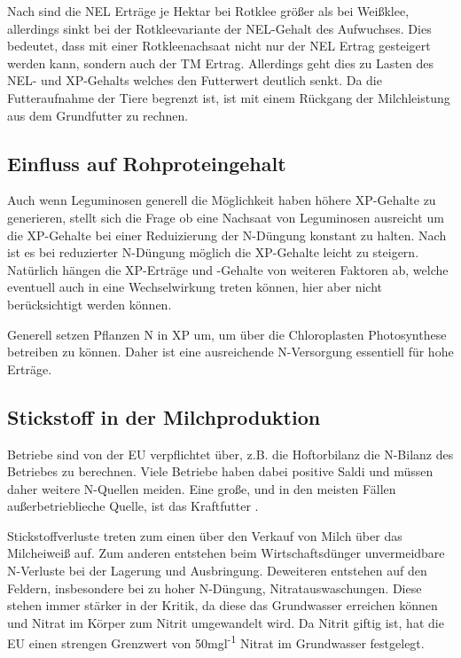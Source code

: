 Nach \textcite[35-36]{weggler2050leguminosen} sind die \ac{NEL} Erträge je Hektar bei Rotklee größer als bei Weißklee, allerdings sinkt bei der Rotkleevariante der \ac{NEL}-Gehalt des Aufwuchses.
Dies bedeutet, dass mit einer Rotkleenachsaat nicht nur der \ac{NEL} Ertrag gesteigert werden kann, sondern auch der \ac{TM} Ertrag.
Allerdings geht dies zu Lasten des \ac{NEL}- und \ac{XP}-Gehalts welches den Futterwert deutlich senkt.
Da die Futteraufnahme der Tiere begrenzt ist, ist mit einem Rückgang der Milchleistung aus dem Grundfutter zu rechnen.

\subsection{Einfluss auf Rohproteingehalt}
\label{subsec:Protein}

Auch wenn Leguminosen generell die Möglichkeit haben höhere \ac{XP}-Gehalte zu generieren, stellt sich die Frage ob eine Nachsaat von Leguminosen ausreicht um die \ac{XP}-Gehalte bei einer Reduizierung der N-Düngung konstant zu halten.
Nach \textcite[11]{engel2013protein} ist es bei reduzierter N-Düngung möglich die \ac{XP}-Gehalte leicht zu steigern.
Natürlich hängen die \ac{XP}-Erträge und -Gehalte von weiteren Faktoren ab, welche eventuell auch in eine Wechselwirkung treten können, hier aber nicht berücksichtigt werden können.

Generell setzen Pflanzen N in \ac{XP} um, um über die Chloroplasten Photosynthese betreiben zu können.
Daher ist eine ausreichende N-Versorgung essentiell für hohe Erträge.


\subsection{Stickstoff in der Milchproduktion}
\label{subsec:Stickstoff}
Betriebe sind von der \ac{EU} verpflichtet über, z.B. die Hoftorbilanz die N-Bilanz des Betriebes zu berechnen.
Viele Betriebe haben dabei positive Saldi \parencite[7ff]{lellmann2005untersuchungen} und müssen daher weitere N-Quellen meiden.
Eine große, und in den meisten Fällen außerbetrieblieche Quelle, ist das Kraftfutter \parencite[62]{lellmann2005untersuchungen}.

Stickstoffverluste treten zum einen über den Verkauf von Milch über das Milcheiweiß auf.
Zum anderen entstehen beim Wirtschaftsdünger unvermeidbare N-Verluste bei der Lagerung und Ausbringung.
Deweiteren entstehen auf den Feldern, insbesondere bei zu hoher N-Düngung, Nitratauswaschungen.
Diese stehen immer stärker in der Kritik, da diese das Grundwasser erreichen können und Nitrat im Körper zum Nitrit umgewandelt wird.
Da Nitrit giftig ist, hat die \ac{EU} einen strengen Grenzwert von 50mgl\textsuperscript{-1} Nitrat im Grundwasser festgelegt.


